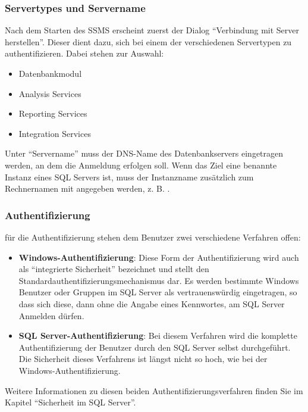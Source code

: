         \subsubsection{Servertypes und Servername}
          Nach dem Starten des SSMS erscheint zuerst der Dialog
          \enquote{Verbindung mit Server herstellen}. Dieser dient dazu, sich bei
          einem der verschiedenen Servertypen zu authentifizieren. Dabei stehen
          zur Auswahl:
          \begin{itemize}
            \item Datenbankmodul
            \item Analysis Services
            \item Reporting Services
            \item Integration Services
          \end{itemize}
          Unter \enquote{Servername} muss der DNS-Name des Datenbankservers
          eingetragen werden, an dem die Anmeldung erfolgen soll. Wenn das Ziel
          eine benannte Instanz eines SQL Servers ist, muss der Instanzname
          zusätzlich zum Rechnernamen mit angegeben werden, z. B.
          .
        \subsubsection{Authentifizierung}
          f\"ur die Authentifizierung stehen dem Benutzer zwei verschiedene
          Verfahren offen:
          \begin{itemize}
            \item \textbf{Windows-Authentifizierung}: Diese Form der
            Authentifizierung wird auch als \enquote{integrierte Sicherheit}
            bezeichnet und stellt den Standardauthentifizierungsmechanismus dar.
            Es werden bestimmte Windows Benutzer oder Gruppen im SQL Server als
            vertrauenswürdig eingetragen, so dass sich diese, dann ohne die
            Angabe eines Kennwortes, am SQL Server Anmelden dürfen.
            \item \textbf{SQL Server-Authentifizierung}: Bei diesem Verfahren
            wird die komplette Authentifizierung der Benutzer durch den SQL
            Server selbst durchgeführt. Die Sicherheit dieses Verfahrens ist
            längst nicht so hoch, wie bei der Windows-Authentifizierung.
          \end{itemize}
          \begin{merke}
            Weitere Informationen zu diesen beiden Authentifizierungsverfahren
            finden Sie im Kapitel \enquote{Sicherheit im SQL Server}.
          \end{merke}
